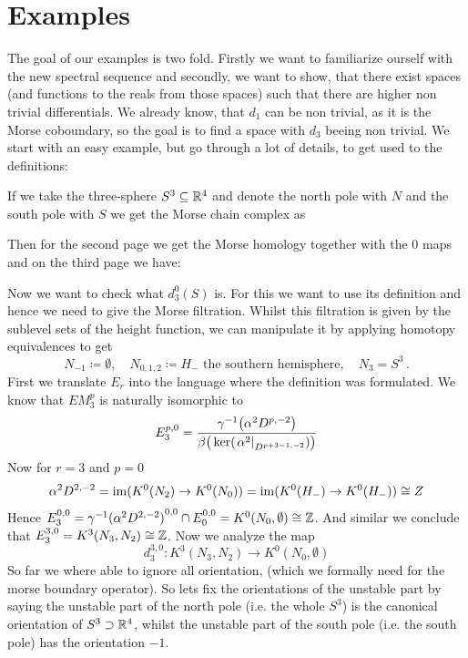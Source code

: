 \section{Examples}
The goal of our examples is two fold. Firstly we want to familiarize ourself with the new spectral sequence and secondly, we want to show, that there exist spaces (and functions to the reals from those spaces) such that there are higher non trivial differentials. We already know, that $d_1$ can be non trivial, as it is the Morse coboundary, so the goal is to find a space with $d_3$ beeing non trivial. 
We start with an easy example, but go through a lot of details, to get used to the definitions:
\begin{example}
	If we take the three-sphere $S^3\subseteq \mathbb{R}^4$ and denote the north pole with $N$ and the south pole with $S$ we get the Morse chain complex as
	\begin{center}
	\end{center}Then for the second page we get the Morse homology together with the 0 maps and on the third page we have: 
	\begin{center}
	\end{center}
	Now we want to check what $d_3^0(S)$ is. For this we want to use its definition and hence we need to give the Morse filtration. Whilst this filtration is given by the sublevel sets of the height function, we can manipulate it by applying homotopy equivalences to get
	\begin{equation*}
		N_{-1}\coloneq\emptyset,\quad N_{0,1,2}\coloneq H_- \text{ the southern hemisphere},\quad  N_3=S^3\,.
	\end{equation*}
	First we translate $E_r$ into the language where the definition was formulated. 
	We know that $EM_3^p$ is naturally isomorphic to $$E^{p,0}_3=\frac{\gamma^{-1}\big(\alpha^2D^{p,-2}\big)}{\beta\big(\ker(\left.\alpha^2\right|_{D^{p+3-1,-2}})\big)}$$
	Now for $r=3$ and $p=0$
	\begin{equation*}
		\alpha^2D^{2,-2}=\mathrm{im} (K^0(N_2)\to K^0(N_0))=\mathrm{im}(K^0(H_-)\to K^0(H_-))\cong Z
	\end{equation*} Hence $E^{0,0}_3={\gamma^{-1}(\alpha^2D^{2,-2})}^{0,0}\cap E^{0,0}_0= K^0(N_0,\emptyset)\cong \mathbb{Z}$. And similar we conclude that $E^{3,0}_3=K^3(N_3,N_2)\cong\mathbb{Z}$. 
	Now we analyze the map 
	\begin{equation*}
		d^{3,0}_3:  K^3(N_3,N_2) \to K^0(N_0,\emptyset) 
	\end{equation*} So far we where able to ignore all orientation, (which we formally need for the morse boundary operator). So lets fix the orientations of the unstable part by saying the unstable part of the north pole (i.e. the whole $S^3$) is the canonical orientation of $S^3\supset \mathbb{R}^4$, whilst the unstable part of the south pole (i.e. the south pole) has the orientation $-1$. 
	

\end{example}
